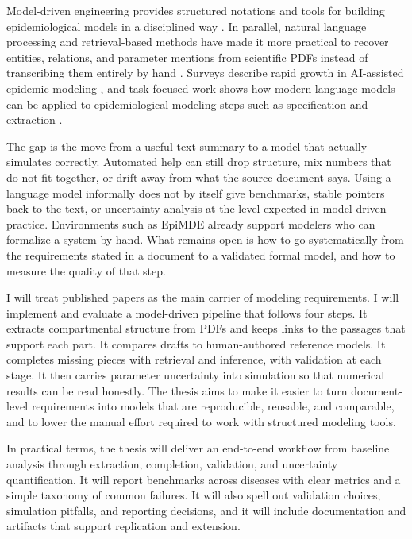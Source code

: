 \documentclass[a4paper,12pt]{article}
\begin{document}
Model-driven engineering provides structured notations and tools for building epidemiological models in a disciplined way \citep{epimde2024,brambilla2012model}. In parallel, natural language processing and retrieval-based methods have made it more practical to recover entities, relations, and parameter mentions from scientific PDFs instead of transcribing them entirely by hand \citep{lewis2020retrieval,achiam2023gpt4}. Surveys describe rapid growth in AI-assisted epidemic modeling \citep{Kraemer2025AI_epidemics,KWOK20243254,Matthay2025}, and task-focused work shows how modern language models can be applied to epidemiological modeling steps such as specification and extraction \citep{11344468,wibaek2023llm_epidemiology}.

The gap is the move from a useful text summary to a model that actually simulates correctly. Automated help can still drop structure, mix numbers that do not fit together, or drift away from what the source document says. Using a language model informally does not by itself give benchmarks, stable pointers back to the text, or uncertainty analysis at the level expected in model-driven practice. Environments such as EpiMDE already support modelers who can formalize a system by hand. What remains open is how to go systematically from the requirements stated in a document to a validated formal model, and how to measure the quality of that step.

I will treat published papers as the main carrier of modeling requirements. I will implement and evaluate a model-driven pipeline that follows four steps. It extracts compartmental structure from PDFs and keeps links to the passages that support each part. It compares drafts to human-authored reference models. It completes missing pieces with retrieval and inference, with validation at each stage. It then carries parameter uncertainty into simulation so that numerical results can be read honestly. The thesis aims to make it easier to turn document-level requirements into models that are reproducible, reusable, and comparable, and to lower the manual effort required to work with structured modeling tools.

In practical terms, the thesis will deliver an end-to-end workflow from baseline analysis through extraction, completion, validation, and uncertainty quantification. It will report benchmarks across diseases with clear metrics and a simple taxonomy of common failures. It will also spell out validation choices, simulation pitfalls, and reporting decisions, and it will include documentation and artifacts that support replication and extension.
\end{document}
